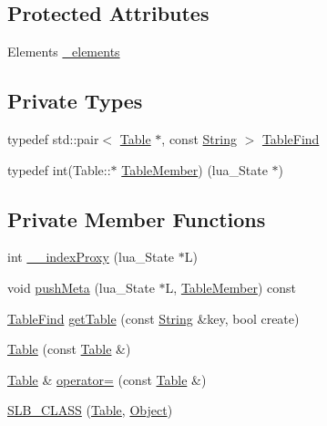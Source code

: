 \subsection*{Protected Attributes}
\begin{DoxyCompactItemize}
\item 
Elements \hyperlink{classSLB_1_1Table_a95ddcf8929bf42d7b3294fdc94eac87b}{\+\_\+elements}
\end{DoxyCompactItemize}
\subsection*{Private Types}
\begin{DoxyCompactItemize}
\item 
typedef std\+::pair$<$ \hyperlink{classSLB_1_1Table}{Table} $\ast$, const \hyperlink{namespaceSLB_a6a4c36e7004d99c0535c2c91c200c9a1}{String} $>$ \hyperlink{classSLB_1_1Table_abd5bba39a3038a146461da289daf55e7}{Table\+Find}
\item 
typedef int(Table\+::$\ast$ \hyperlink{classSLB_1_1Table_a9517177ecd7a0bf985ff9635b0771a32}{Table\+Member}) (lua\+\_\+\+State $\ast$)
\end{DoxyCompactItemize}
\subsection*{Private Member Functions}
\begin{DoxyCompactItemize}
\item 
int \hyperlink{classSLB_1_1Table_a77fd6ea0f4b55bde5b88192485ed98ea}{\+\_\+\+\_\+index\+Proxy} (lua\+\_\+\+State $\ast$L)
\item 
void \hyperlink{classSLB_1_1Table_a3b5ef978dedb67fa0aa0d6c0ec716fc0}{push\+Meta} (lua\+\_\+\+State $\ast$L, \hyperlink{classSLB_1_1Table_a9517177ecd7a0bf985ff9635b0771a32}{Table\+Member}) const 
\item 
\hyperlink{classSLB_1_1Table_abd5bba39a3038a146461da289daf55e7}{Table\+Find} \hyperlink{classSLB_1_1Table_a4d3c22de7a035aee476fbb7931ee38bf}{get\+Table} (const \hyperlink{namespaceSLB_a6a4c36e7004d99c0535c2c91c200c9a1}{String} \&key, bool create)
\item 
\hyperlink{classSLB_1_1Table_af8c48e8793ed673d44b92d6466517a3b}{Table} (const \hyperlink{classSLB_1_1Table}{Table} \&)
\item 
\hyperlink{classSLB_1_1Table}{Table} \& \hyperlink{classSLB_1_1Table_a4ff06bde10538dc033bb4f56bf33d7d1}{operator=} (const \hyperlink{classSLB_1_1Table}{Table} \&)
\item 
\hyperlink{classSLB_1_1Table_a87ec8041f1452456f81babe04f5be4a9}{S\+L\+B\+\_\+\+C\+L\+A\+SS} (\hyperlink{classSLB_1_1Table}{Table}, \hyperlink{classSLB_1_1Object}{Object})
\end{DoxyCompactItemize}

